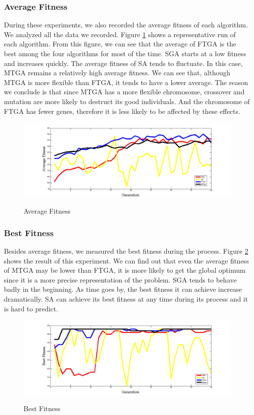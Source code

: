 \documentclass{article} %
\begin{document}
\subsubsection{Average Fitness}
During these experiments, we also recorded the average fitness of each algorithm. We analyzed all the data we recorded. Figure \ref{fig:avg_fitness} shows a representative run of each algorithm. From this figure, we can see that the average of FTGA is the best among the four algorithms for most of the time. SGA starts at a low fitness and increases quickly. The average fitness of SA tends to fluctuate. In this case, MTGA remains a relatively high average fitness. We can see that, although MTGA is more flexible than FTGA, it tends to have a lower average. The reason we conclude is that since MTGA has a more flexible chromosome, crossover and mutation are more likely to destruct its good individuals. And the chromosome of FTGA has fewer genes, therefore it is less likely to be affected by these effects.

\begin{figure}[htbp]
\centering
\includegraphics[width=\textwidth]{images/exp/avg_fitness.png}
\label{fig:avg_fitness}
\caption{Average Fitness}
\end{figure}

\subsubsection{Best Fitness}
Besides average fitness, we measured the best fitness during the process. Figure \ref{fig:best_fitness} shows the result of this experiment. We can find out that even the average fitness of MTGA may be lower than FTGA, it is more likely to get the global optimum since it is a more precise representation of the problem. SGA tends to behave badly in the beginning. As time goes by, the best fitness it can achieve increase dramatically. SA can achieve its best fitness at any time during its process and it is hard to predict. 

\begin{figure}[h]
\centering
\includegraphics[width=\textwidth]{images/exp/best_all.png}
\label{fig:best_fitness}
\caption{Best Fitness}
\end{figure}
\end{document}
